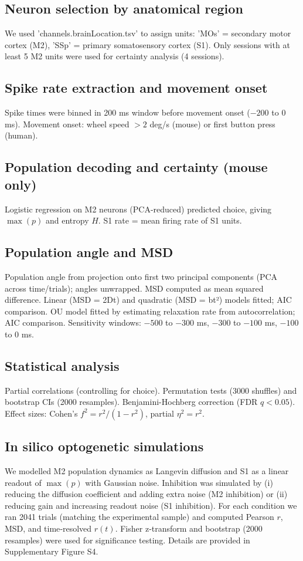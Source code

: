\documentclass[10pt,onecolumn]{article}
\begin{document}
\subsection{Neuron selection by anatomical region}
We used 'channels.brainLocation.tsv' to assign units: 'MOs' = secondary motor cortex (M2), 'SSp' = primary somatosensory cortex (S1). Only sessions with at least 5 M2 units were used for certainty analysis (4 sessions).

\subsection{Spike rate extraction and movement onset}
Spike times were binned in 200 ms window before movement onset (\(-200\) to \(0\) ms). Movement onset: wheel speed \(>2\) deg/s (mouse) or first button press (human).

\subsection{Population decoding and certainty (mouse only)}
Logistic regression on M2 neurons (PCA-reduced) predicted choice, giving \(\max(p)\) and entropy \(H\). S1 rate = mean firing rate of S1 units.

\subsection{Population angle and MSD}
Population angle from projection onto first two principal components (PCA across time/trials); angles unwrapped. MSD computed as mean squared difference. Linear (MSD = 2Dt) and quadratic (MSD = bt²) models fitted; AIC comparison. OU model fitted by estimating relaxation rate from autocorrelation; AIC comparison. Sensitivity windows: \(-500\) to \(-300\) ms, \(-300\) to \(-100\) ms, \(-100\) to \(0\) ms.

\subsection{Statistical analysis}
Partial correlations (controlling for choice). Permutation tests (3000 shuffles) and bootstrap CIs (2000 resamples). Benjamini-Hochberg correction (FDR \(q<0.05\)). Effect sizes: Cohen's \(f^2 = r^2/(1-r^2)\), partial \(\eta^2 = r^2\).

\subsection{In silico optogenetic simulations}
We modelled M2 population dynamics as Langevin diffusion and S1 as a linear readout of \(\max(p)\) with Gaussian noise. Inhibition was simulated by (i) reducing the diffusion coefficient and adding extra noise (M2 inhibition) or (ii) reducing gain and increasing readout noise (S1 inhibition). For each condition we ran 2041 trials (matching the experimental sample) and computed Pearson \(r\), MSD, and time‑resolved \(r(t)\). Fisher z‑transform and bootstrap (2000 resamples) were used for significance testing. Details are provided in Supplementary Figure S4.
\end{document}
